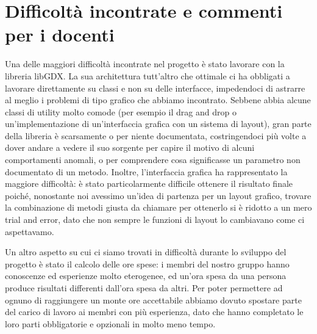 \section{Difficoltà incontrate e commenti per i docenti}

Una delle maggiori difficoltà incontrate nel progetto è stato lavorare con la
libreria libGDX. La sua architettura tutt'altro che ottimale ci ha obbligati a
lavorare direttamente su classi e non su delle interfacce, impedendoci di
astrarre al meglio i problemi di tipo grafico che abbiamo incontrato. Sebbene
abbia alcune classi di utility molto comode (per esempio il drag and drop o
un'implementazione di un'interfaccia grafica con un sistema di layout), gran
parte della libreria è scarsamente o per niente documentata, costringendoci più
volte a dover andare a vedere il suo sorgente per capire il motivo di alcuni
comportamenti anomali, o per comprendere cosa significasse un parametro non
documentato di un metodo. Inoltre, l'interfaccia grafica ha rappresentato la
maggiore difficoltà: è stato particolarmente difficile ottenere il risultato
finale poiché, nonostante noi avessimo un'idea di partenza per un layout
grafico, trovare la combinazione di metodi giusta da chiamare per ottenerlo si
è ridotto a un mero trial and error, dato che non sempre le funzioni di layout
lo cambiavano come ci aspettavamo.

Un altro aspetto su cui ci siamo trovati in difficoltà durante lo sviluppo del
progetto è stato il calcolo delle ore spese: i membri del nostro gruppo hanno
conoscenze ed esperienze molto eterogenee, ed un'ora spesa da una persona
produce risultati differenti dall'ora spesa da altri. Per poter permettere ad
ognuno di raggiungere un monte ore accettabile abbiamo dovuto spostare parte
del carico di lavoro ai membri con più esperienza, dato che hanno completato le
loro parti obbligatorie e opzionali in molto meno tempo.
